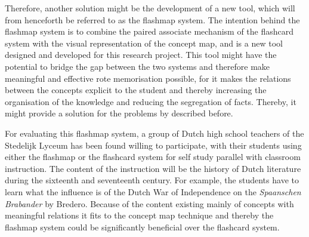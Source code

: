


Therefore, another solution might be the development of a new tool, which will from henceforth be referred to as the flashmap system. The intention behind the flashmap system is to combine the paired associate mechanism of the flashcard system with the visual representation of the concept map, and is a new tool designed and developed for this research project. This tool might have the potential to bridge the gap between the two systems and therefore make meaningful and effective rote memorisation possible, for it makes the relations between the concepts explicit to the student and thereby increasing the organisation of the knowledge and reducing the segregation of facts. Thereby, it might provide a solution for the problems by  described before.

For evaluating this flashmap system, a group of Dutch high school teachers of the Stedelijk Lyceum has been found willing to participate, with their students using either the flashmap or the flashcard system for self study parallel with classroom instruction. The content of the instruction will be the history of Dutch literature during the sixteenth and seventeenth century. For example, the students have to learn what the influence is of the Dutch War of Independence on the \emph{Spaanschen Brabander} by Bredero. Because of the content existing mainly of concepts with meaningful relations it fits to the concept map technique and thereby the flashmap system could be significantly beneficial over the flashcard system.

